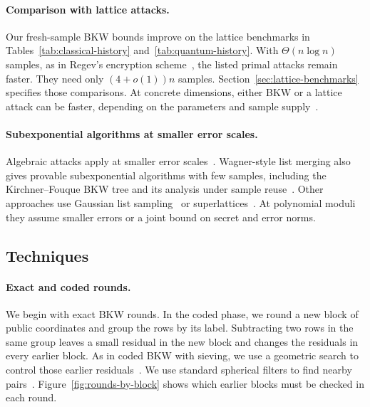 \documentclass[runningheads,envcountsame,envcountsect,orivec]{llncs}
\begin{document}
\paragraph{Comparison with lattice attacks.}
Our fresh-sample BKW bounds improve on the lattice benchmarks
in Tables~\ref{tab:classical-history} and~\ref{tab:quantum-history}.
With $\Theta(n\log n)$ samples, as in Regev's encryption
scheme~\cite[Section~5]{Regev09}, the listed primal attacks
remain faster. They need only $(4+o(1))n$ samples.
Section~\ref{sec:lattice-benchmarks} specifies those comparisons.
At concrete dimensions, either BKW or a lattice attack can be
faster, depending on the parameters and sample
supply~\cite{APS15,BGJMW21,WBLW25}.

\paragraph{Subexponential algorithms at smaller error scales.}
Algebraic attacks apply at smaller error scales~\cite{AG11}.
Wagner-style list merging also gives provable subexponential
algorithms with few samples, including the Kirchner--Fouque
BKW tree and its analysis under sample reuse~\cite{KF15,LV26}.
Other approaches use Gaussian list sampling~\cite{HGH26}
or superlattices~\cite{FSLW26,CJWZ26}.
At polynomial moduli they assume smaller errors or a joint
bound on secret and error norms.

\subsection{Techniques}
\label{sec:algorithm-overview}

\paragraph{Exact and coded rounds.}
We begin with exact BKW rounds. In the coded phase,
we round a new block of public coordinates and group the
rows by its label. Subtracting two rows in the same group
leaves a small residual in the new block and changes the
residuals in every earlier block. As in coded BKW with
sieving, we use a geometric search to control those earlier
residuals~\cite{GJS15,GJMS17,GJMS19}. We use standard
spherical filters to find nearby pairs~\cite{BDGL16}.
Figure~\ref{fig:rounds-by-block} shows which earlier blocks
must be checked in each round.
\end{document}
